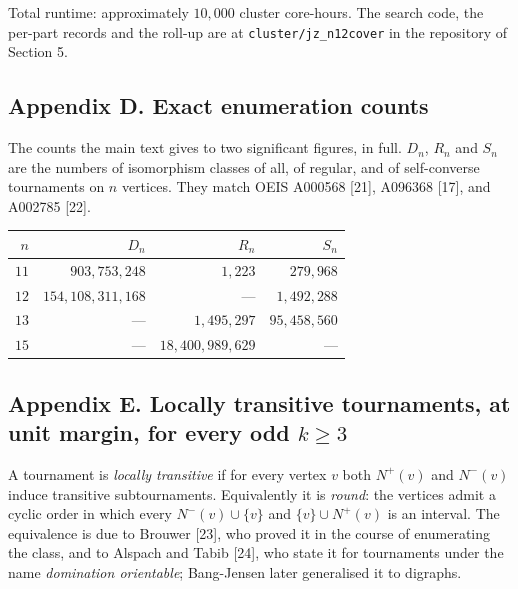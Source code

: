 \documentclass[
]{article}
\newcounter{none} %
\begin{document}
Total runtime: approximately \(10{,}000\) cluster core-hours. The search
code, the per-part records and the roll-up are at
\texttt{cluster/jz\_n12cover} in the repository of Section 5.

\subsection{Appendix D. Exact enumeration
counts}\label{appendix-d.-exact-enumeration-counts}

The counts the main text gives to two significant figures, in full.
\(D_n\), \(R_n\) and \(S_n\) are the numbers of isomorphism classes of
all, of regular, and of self-converse tournaments on \(n\) vertices.
They match OEIS A000568 {[}21{]}, A096368 {[}17{]}, and A002785
{[}22{]}.

{\def\LTcaptype{none} %
\begin{longtable}[]{@{}rrrr@{}}
\toprule\noalign{}
\(n\) & \(D_n\) & \(R_n\) & \(S_n\) \\
\midrule\noalign{}
\endhead
\bottomrule\noalign{}
\endlastfoot
\(11\) & \(903{,}753{,}248\) & \(1{,}223\) & \(279{,}968\) \\
\(12\) & \(154{,}108{,}311{,}168\) & --- & \(1{,}492{,}288\) \\
\(13\) & --- & \(1{,}495{,}297\) & \(95{,}458{,}560\) \\
\(15\) & --- & \(18{,}400{,}989{,}629\) & --- \\
\end{longtable}
}

\subsection{\texorpdfstring{Appendix E. Locally transitive tournaments,
at unit margin, for every odd
\(k \geq 3\)}{Appendix E. Locally transitive tournaments, at unit margin, for every odd k \textbackslash geq 3}}\label{appendix-e.-locally-transitive-tournaments-at-unit-margin-for-every-odd-k-geq-3}

A tournament is \emph{locally transitive} if for every vertex \(v\) both
\(N^{+}(v)\) and \(N^{-}(v)\) induce transitive subtournaments.
Equivalently it is \emph{round}: the vertices admit a cyclic order in
which every \(N^{-}(v) \cup \{v\}\) and \(\{v\} \cup N^{+}(v)\) is an
interval. The equivalence is due to Brouwer {[}23{]}, who proved it in
the course of enumerating the class, and to Alspach and Tabib {[}24{]},
who state it for tournaments under the name \emph{domination
orientable}; Bang-Jensen later generalised it to digraphs.
\end{document}
